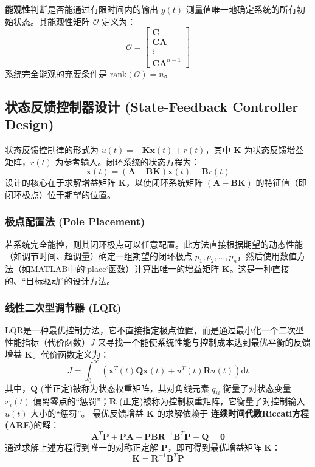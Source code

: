 \documentclass[12pt, a4paper]{article}
\begin{document}
\textbf{能观性}判断是否能通过有限时间内的输出 $y(t)$ 测量值唯一地确定系统的所有初始状态。其能观性矩阵 $\mathcal{O}$ 定义为：
\begin{equation}
    \mathcal{O} = 
    \begin{bmatrix}
        \bm{C} \\ \bm{CA} \\ \vdots \\ \bm{CA}^{n-1}
    \end{bmatrix}
    \label{eq:observability}
\end{equation}
系统完全能观的充要条件是 $\mathrm{rank}(\mathcal{O}) = n$。

\subsection{状态反馈控制器设计 (State-Feedback Controller Design)}
状态反馈控制律的形式为 $u(t) = - \bm{K}\bm{x}(t) + r(t)$，其中 $\bm{K}$ 为状态反馈增益矩阵，$r(t)$ 为参考输入。闭环系统的状态方程为：
\begin{equation}
    \dot{\bm{x}}(t) = (\bm{A} - \bm{B}\bm{K})\bm{x}(t) + \bm{B}r(t)
    \label{eq:closed_loop_state}
\end{equation}
设计的核心在于求解增益矩阵 $\bm{K}$，以使闭环系统矩阵 $(\bm{A} - \bm{B}\bm{K})$ 的特征值（即闭环极点）位于期望的位置。

\subsubsection{极点配置法 (Pole Placement)}
若系统完全能控，则其闭环极点可以任意配置。此方法直接根据期望的动态性能（如调节时间、超调量）确定一组期望的闭环极点 $p_1, p_2, \dots, p_n$，然后使用数值方法（如MATLAB中的`place`函数）计算出唯一的增益矩阵 $\bm{K}$。这是一种直接的、“目标驱动”的设计方法。

\subsubsection{线性二次型调节器 (LQR)}
LQR是一种最优控制方法，它不直接指定极点位置，而是通过最小化一个二次型性能指标（代价函数）$J$ 来寻找一个能使系统性能与控制成本达到最优平衡的反馈增益 $\bm{K}$。代价函数定义为：
\begin{equation}
    J = \int_{0}^{\infty} \left( \bm{x}^T(t)\bm{Q}\bm{x}(t) + u^T(t)\bm{R}u(t) \right) \mathrm{d}t
    \label{eq:lqr_cost}
\end{equation}
其中，$\bm{Q}$ (半正定)被称为状态权重矩阵，其对角线元素 $q_{ii}$ 衡量了对状态变量 $x_i(t)$ 偏离零点的“惩罚”；$\bm{R}$ (正定)被称为控制权重矩阵，它衡量了对控制输入 $u(t)$ 大小的“惩罚”。
最优反馈增益 $\bm{K}$ 的求解依赖于
\textbf{连续时间代数Riccati方程 (ARE)}的解：
\begin{equation}
    \bm{A}^T\bm{P} + \bm{P}\bm{A} - \bm{P}\bm{B}\bm{R}^{-1}\bm{B}^T\bm{P} + \bm{Q} = \bm{0}
    \label{eq:are}
\end{equation}
通过求解上述方程得到唯一的对称正定解 $\bm{P}$，即可得到最优增益矩阵 $\bm{K}$：
\begin{equation}
    \bm{K} = \bm{R}^{-1}\bm{B}^T\bm{P}
    \label{eq:lqr_gain}
\end{equation}
\end{document}
